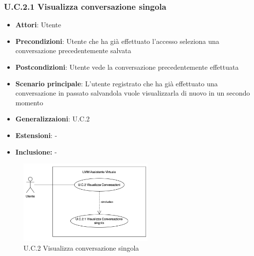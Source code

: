 \subsubsection{U.C.2.1 Visualizza conversazione singola}
\begin{itemize}
    \item \textbf{Attori}: Utente
    \item \textbf{Precondizioni}: Utente che ha già effettuato l’accesso seleziona una conversazione precedentemente salvata
    \item \textbf{Postcondizioni}: Utente vede la conversazione precedentemente effettuata
    \item \textbf{Scenario principale}: L’utente registrato che ha già effettuato una conversazione in passato salvandola vuole visualizzarla di nuovo in un secondo momento
    \item \textbf{Generalizzaioni}: U.C.2
    \item \textbf{Estensioni}: -
    \item \textbf{Inclusione:} -
\end{itemize}
\begin{figure}[h!]
    \centering
    \includegraphics[width=0.6\textwidth]{img/UC2-1.png}
    \caption{U.C.2 Visualizza conversazione singola}
\end{figure}
